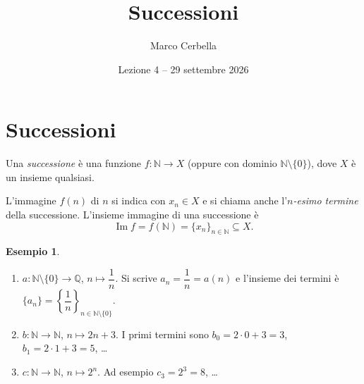 \documentclass[11pt,a4paper]{article}
\title{Successioni}
\author{Marco Cerbella}
\date{Lezione 4 -- 29 settembre 2026}
\theoremstyle{definition}
\newtheorem*{esempio}{Esempio}
\begin{document}
\maketitle

\section{Successioni}

\begin{definizione}
Una \emph{successione} è una funzione $f : \mathbb{N} \to X$ (oppure con
dominio $\mathbb{N} \setminus \{0\}$), dove $X$ è un insieme qualsiasi.
\end{definizione}

L'immagine $f(n)$ di $n$ si indica con $x_n \in X$ e si chiama anche
l'\emph{$n$-esimo termine} della successione. L'insieme immagine di una
successione è
\[
\operatorname{Im} f = f(\mathbb{N}) = \{x_n\}_{n \in \mathbb{N}}
\subseteq X.
\]

\begin{esempio}
\leavevmode
\begin{enumerate}
    \item $a : \mathbb{N} \setminus \{0\} \to \mathbb{Q}$,
          $n \mapsto \dfrac{1}{n}$. Si scrive $a_n = \dfrac{1}{n} = a(n)$
          e l'insieme dei termini è
          $\{a_n\} = \left\{\dfrac{1}{n}\right\}_{n \in \mathbb{N}
          \setminus \{0\}}$.

    \item $b : \mathbb{N} \to \mathbb{N}$, $n \mapsto 2n + 3$. I primi
          termini sono $b_0 = 2 \cdot 0 + 3 = 3$,
          $b_1 = 2 \cdot 1 + 3 = 5$, \dots

    \item $c : \mathbb{N} \to \mathbb{N}$, $n \mapsto 2^n$. Ad esempio
          $c_3 = 2^3 = 8$, \dots
\end{enumerate}
\end{esempio}
\end{document}
